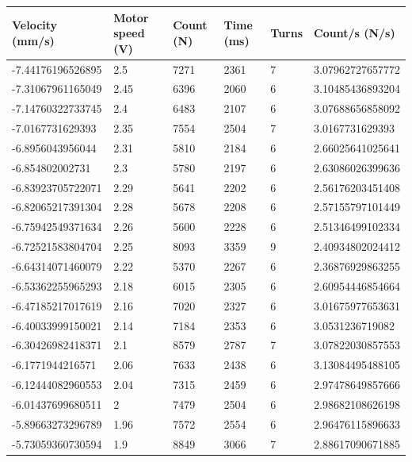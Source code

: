 \documentclass[a4paper]{report}
\numberwithin{equation}{section}
\begin{document}
\begin{table}[!ht]
    \centering
    \begin{tabular}{|l|l|l|l|l|l|}
    \hline
        Velocity (mm/s) & Motor speed (V) & Count (N) & Time (ms) & Turns & Count/s (N/s)\\ \hline
        -7.44176196526895 & 2.5 & 7271 & 2361 & 7 & 3.07962727657772 \\ \hline
        -7.31067961165049 & 2.45 & 6396 & 2060 & 6 & 3.10485436893204 \\ \hline
        -7.14760322733745 & 2.4 & 6483 & 2107 & 6 & 3.07688656858092 \\ \hline
        -7.0167731629393 & 2.35 & 7554 & 2504 & 7 & 3.0167731629393 \\ \hline
        -6.8956043956044 & 2.31 & 5810 & 2184 & 6 & 2.66025641025641 \\ \hline
        -6.854802002731 & 2.3 & 5780 & 2197 & 6 & 2.63086026399636 \\ \hline
        -6.83923705722071 & 2.29 & 5641 & 2202 & 6 & 2.56176203451408 \\ \hline
        -6.82065217391304 & 2.28 & 5678 & 2208 & 6 & 2.57155797101449 \\ \hline
        -6.75942549371634 & 2.26 & 5600 & 2228 & 6 & 2.51346499102334 \\ \hline
        -6.72521583804704 & 2.25 & 8093 & 3359 & 9 & 2.40934802024412 \\ \hline
        -6.64314071460079 & 2.22 & 5370 & 2267 & 6 & 2.36876929863255 \\ \hline
        -6.53362255965293 & 2.18 & 6015 & 2305 & 6 & 2.60954446854664 \\ \hline
        -6.47185217017619 & 2.16 & 7020 & 2327 & 6 & 3.01675977653631 \\ \hline
        -6.40033999150021 & 2.14 & 7184 & 2353 & 6 & 3.0531236719082 \\ \hline
        -6.30426982418371 & 2.1 & 8579 & 2787 & 7 & 3.07822030857553 \\ \hline
        -6.1771944216571 & 2.06 & 7633 & 2438 & 6 & 3.13084495488105 \\ \hline
        -6.12444082960553 & 2.04 & 7315 & 2459 & 6 & 2.97478649857666 \\ \hline
        -6.01437699680511 & 2 & 7479 & 2504 & 6 & 2.98682108626198 \\ \hline
        -5.89663273296789 & 1.96 & 7572 & 2554 & 6 & 2.96476115896633 \\ \hline
        -5.73059360730594 & 1.9 & 8849 & 3066 & 7 & 2.88617090671885 \\ \hline

\end{tabular}
\end{table}
\end{document}

